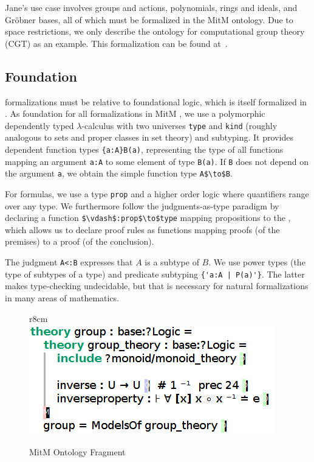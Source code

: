 Jane's use case involves groups and actions, polynomials, rings and ideals, and Gröbner bases, all of which must be formalized in the MitM ontology.
Due to space restrictions, we only describe the ontology for computational group theory (CGT) as an example.
This formalization can be found at~\cite{mitm:groups:on}.

\subsection{Foundation}

\OMMT formalizations must be relative to foundational logic, which is itself formalized in \OMMT.
As foundation for all formalizations in MitM \cite{mitm:foundation:on}, we use a polymorphic dependently typed $\lambda$-calculus with two universes \lstinline|type| and \lstinline|kind| (roughly analogous to sets and proper classes in set theory) and subtyping.
It provides dependent function types \lstinline|{a:A}B(a)|, representing the type of all functions mapping an argument \lstinline|a:A| to some element of type \lstinline|B(a)|. If \lstinline|B| does not depend on the argument \lstinline|a|, we obtain the simple function type \lstinline[mathescape]|A$\to$B|.

For formulas, we use a type \lstinline|prop| and a higher order logic where quantifiers range over any type.
We furthermore follow the judgments-as-type paradigm by declaring a function \lstinline[mathescape]|$\vdash$:prop$\to$type| mapping propositions to the , which allows us to declare proof rules as functions mapping proofs (of the premises) to a proof (of the conclusion).

The judgment \lstinline|A<:B| expresses that $A$ is a subtype of $B$.
We use power types (the type of subtypes of a type) and predicate subtyping \lstinline?{'a:A | P(a)'}?.
The latter makes type-checking undecidable, but that is necessary for natural formalizations in many areas of mathematics.

\begin{figure}r{8cm}\vspace*{-1em}
  \includegraphics[width=.5\textwidth]{mitm1}
  \caption{MitM Ontology Fragment}\label{fig:mitm1}
\end{figure}

